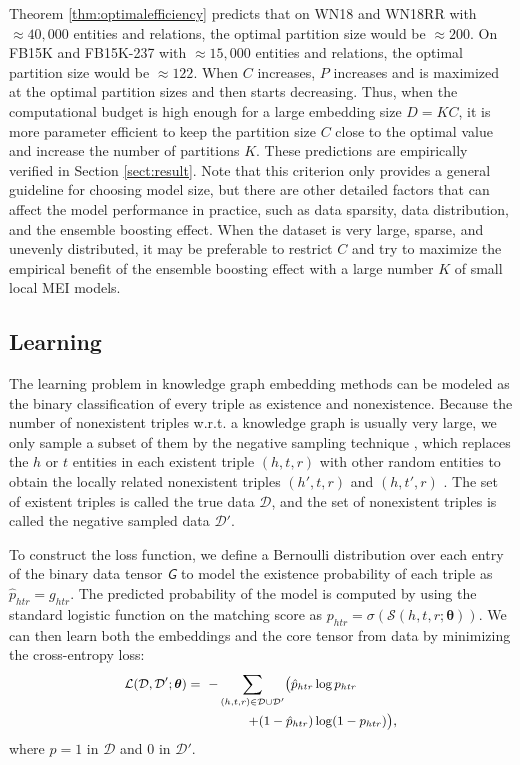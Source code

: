 \documentclass{ecai}
\newcommand{\tens}[1]{\bm{\mathsfit{#1}}}
\def\tG{{\tens{G}}}
\def\gD{{\mathcal{D}}}
\def\gL{{\mathcal{L}}}
\def\gS{{\mathcal{S}}}
\theoremstyle{plain}  \newtheorem{thm}{Theorem}  \newtheorem{lem}[thm]{Lemma}  \newtheorem{prop}[thm]{Proposition}
\theoremstyle{remark}  \newtheorem*{rem}{Remark}
\begin{document}
Theorem \ref{thm:optimalefficiency} predicts that on WN18 and WN18RR with $ \approx 40,000 $ entities and relations, the optimal partition size would be $ \approx 200 $. On FB15K and FB15K-237 with $ \approx 15,000 $ entities and relations, the optimal partition size would be $ \approx 122 $. When $ C $ increases, $ P $ increases and is maximized at the optimal partition sizes and then starts decreasing. Thus, when the computational budget is high enough for a large embedding size $ D = KC $, it is more parameter efficient to keep the partition size $ C $ close to the optimal value and increase the number of partitions $ K $. These predictions are empirically verified in Section \ref{sect:result}. Note that this criterion only provides a general guideline for choosing model size, but there are other detailed factors that can affect the model performance in practice, such as data sparsity, data distribution, and the ensemble boosting effect. When the dataset is very large, sparse, and unevenly distributed, it may be preferable to restrict $ C $ and try to maximize the empirical benefit of the ensemble boosting effect with a large number $ K $ of small local MEI models.

\subsection{Learning}
The learning problem in knowledge graph embedding methods can be modeled as the binary classification of every triple as existence and nonexistence. Because the number of nonexistent triples w.r.t. a knowledge graph is usually very large, we only sample a subset of them by the negative sampling technique \cite{mikolov_efficientestimationword_2013}, which replaces the $ h $ or $ t $ entities in each existent triple $ (h, t, r) $ with other random entities to obtain the locally related nonexistent triples $ (h', t, r) $ and $ (h, t', r) $ \cite{bordes_translatingembeddingsmodeling_2013}. The set of existent triples is called the true data $ \gD $, and the set of nonexistent triples is called the negative sampled data $ \gD' $.

To construct the loss function, we define a Bernoulli distribution over each entry of the binary data tensor $ \tG $ to model the existence probability of each triple as $ \hat{p}_{htr} = g_{htr} $. The predicted probability of the model is computed by using the standard logistic function on the matching score as $ p_{htr} = \sigma(\gS(h,t,r;\bm{\theta})) $. We can then learn both the embeddings and the core tensor from data by minimizing the cross-entropy loss:
\begin{equation} \label{eq:loss_crossentropy}
\small
\begin{split}
\gL(\gD, \gD';\bm{\theta}) =\ - \sum_{(h, t, r) \in \gD \cup \gD'}\bigl( \hat{p}_{htr} &\log p_{htr}\\
+ (1 - \hat{p}_{htr}) &\log (1 - p_{htr}) \bigr),
\end{split}
\end{equation}
where $ \hat{p} = 1 $ in $ \gD $ and $ 0 $ in $ \gD' $. 
\end{document}
